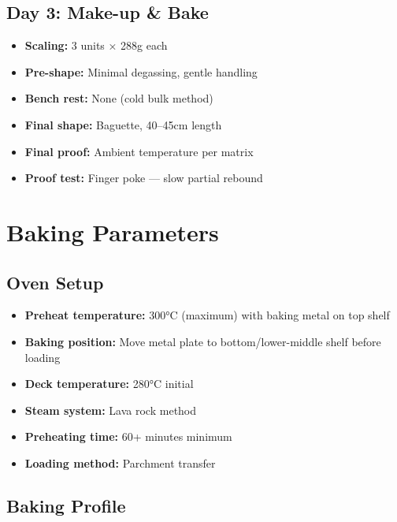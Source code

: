 \documentclass[10pt,a4paper]{article}
\begin{document}
    \subsection{Day 3: Make-up \& Bake}
    \begin{itemize}[leftmargin=*]
        \item \textbf{Scaling:} 3 units × 288g each
        \item \textbf{Pre-shape:} Minimal degassing, gentle handling
        \item \textbf{Bench rest:} None (cold bulk method)
        \item \textbf{Final shape:} Baguette, 40--45cm length
        \item \textbf{Final proof:} Ambient temperature per matrix
        \item \textbf{Proof test:} Finger poke --- slow partial rebound
    \end{itemize}


    \section{Baking Parameters}

    \subsection{Oven Setup}
    \begin{itemize}[leftmargin=*]
        \item \textbf{Preheat temperature:} 300°C (maximum) with baking metal on top shelf
        \item \textbf{Baking position:} Move metal plate to bottom/lower-middle shelf before loading
        \item \textbf{Deck temperature:} 280°C initial
        \item \textbf{Steam system:} Lava rock method
        \item \textbf{Preheating time:} 60+ minutes minimum
        \item \textbf{Loading method:} Parchment transfer
    \end{itemize}

    \subsection{Baking Profile}
\end{document}
